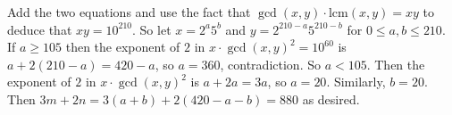 Add the two equations and use the fact that $\gcd\left(x,y\right)\cdot\mathrm{lcm}\left(x,y\right)=xy$ to deduce that $xy=10^{210}$. So let $x=2^a5^b$ and $y=2^{210-a}5^{210-b}$ for $0\leq a,b\leq210$. If $a\geq105$ then the exponent of $2$ in $x\cdot\gcd\left(x,y\right)^2=10^{60}$ is $a+2\left(210-a\right)=420-a$, so $a=360$, contradiction. So $a<105$. Then the exponent of $2$ in $x\cdot\gcd\left(x,y\right)^2$ is $a+2a=3a$, so $a=20$. Similarly, $b=20$. Then $3m+2n=3\left(a+b\right)+2\left(420-a-b\right)=\boxed{880}$ as desired.